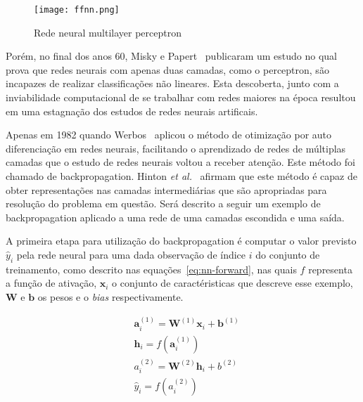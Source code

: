 \begin{figure}
\begin{center} {
    \begin{center}
    \texttt{[image: ffnn.png]}
    \caption{Rede neural multilayer perceptron}
    \label{fig:ff-neural-net}
    \end{center}
}
\end{center}
\end{figure}

Porém, no final dos anos 60, Misky e Papert~\cite{minsky72} publicaram um estudo no qual prova que redes neurais com
apenas duas camadas, como o perceptron, são incapazes de realizar classificações não lineares.
Esta descoberta, junto com a inviabilidade computacional de se trabalhar com redes maiores na época resultou em uma
estagnação dos estudos de redes neurais artificais.

Apenas em 1982 quando Werbos~\cite{werbos82} aplicou o método de otimização por auto diferenciação em redes neurais,
facilitando o aprendizado de redes de múltiplas camadas que o estudo de redes neurais voltou a receber atenção.
Este método foi chamado de backpropagation.
Hinton \textit{et al.}~\cite{williams86} afirmam que este método é capaz de obter representações nas camadas
intermediárias que são apropriadas para resolução do problema em questão.
Será descrito a seguir um exemplo de backpropagation aplicado a uma rede de uma camadas escondida e uma saída.

A primeira etapa para utilização do backpropagation é computar o valor previsto ${\hat{y}_i}$ pela rede neural para
uma dada observação de índice $i$ do conjunto de treinamento, como descrito nas equações~\ref{eq:nn-forward}, nas
quais $f$ representa a função de ativação, $\mathbf{x}_i$ o conjunto de caractéristicas que descreve esse exemplo,
$\mathbf{W}$ e $\mathbf{b}$ os pesos e o \textit{bias} respectivamente.

\begin{subequations} \label{eq:nn-forward}
\begin{align}
    &\mathbf{a}_i^{(1)} = \mathbf{W}^{(1)} \mathbf{x}_i + \mathbf{b}^{(1)}\\
    &\mathbf{h}_i = f(\mathbf{a}_i^{(1)})\\
    &a_i^{(2)} = \mathbf{W}^{(2)} \mathbf{h}_i + b^{(2)}\\
    &\hat{y}_i = f(a_i^{(2)})
\end{align}
\end{subequations}

